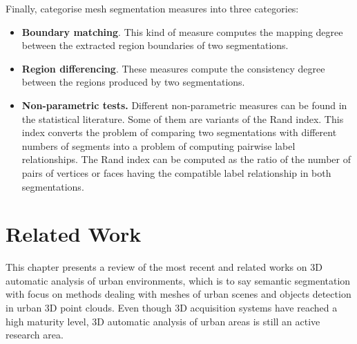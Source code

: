 \documentclass{kththesis}
\begin{document}
Finally, \textcite{ComparativeStudyMetrics} categorise mesh segmentation measures into three categories:  
\begin{itemize}
    \item \textbf{Boundary matching}. This kind of measure computes
the mapping degree between the extracted region
boundaries of two segmentations.
    \item \textbf{Region differencing}. These measures compute the
consistency degree between the regions produced by
two segmentations.
    \item \textbf{Non-parametric tests.} Different non-parametric measures can be found in the statistical literature. Some of them are variants of the Rand index.  This index converts the
problem of comparing two segmentations
with different numbers of segments into a problem of
computing pairwise label relationships. The Rand index can be computed
as the ratio of the number of pairs of vertices or faces
having the compatible label relationship in both segmentations. 
\end{itemize}





\chapter{Related Work}
This chapter presents a review of the most recent and related works on 3D automatic analysis of urban environments, which is to say semantic segmentation with focus on methods dealing with meshes of urban scenes and objects detection in urban 3D point clouds. Even though 3D acquisition systems have reached a high maturity level, 3D automatic
analysis of urban areas is still an active research area. 
\end{document}
